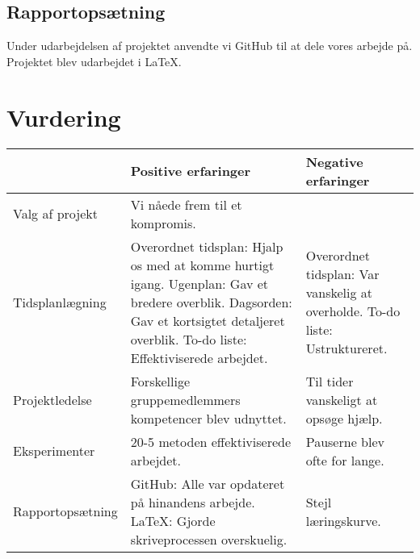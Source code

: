 \subsection{Rapportopsætning}
Under udarbejdelsen af projektet anvendte vi GitHub til at dele vores arbejde på. Projektet blev udarbejdet i LaTeX. 

\section{Vurdering}



\begin{table}[h]
	\begin{tabular}{|l|p{5cm}|p{5cm}|}
		\hline
		&\textbf{Positive erfaringer}&\textbf{Negative erfaringer}\\ \hline
		Valg af projekt  & Vi nåede frem til et kompromis.& \\ \hline  
		Tidsplanlægning  & Overordnet tidsplan: Hjalp os med at komme hurtigt igang.\newline
		Ugenplan: Gav et bredere overblik.\newline
		Dagsorden: Gav et kortsigtet detaljeret overblik.\newline
		To-do liste: Effektiviserede arbejdet. & Overordnet tidsplan: Var vanskelig at overholde. \newline 
		To-do liste: Ustruktureret. \\ \hline
		Projektledelse   & Forskellige gruppemedlemmers kompetencer blev udnyttet. & Til tider vanskeligt at opsøge hjælp. \\ \hline
		Eksperimenter    & 20-5 metoden effektiviserede arbejdet. & Pauserne blev ofte for lange. \\ \hline
		Rapportopsætning & GitHub: Alle var opdateret på hinandens arbejde.\newline
		LaTeX: Gjorde skriveprocessen overskuelig. & Stejl læringskurve.\\ \hline
     
	\end{tabular}
\end{table}



